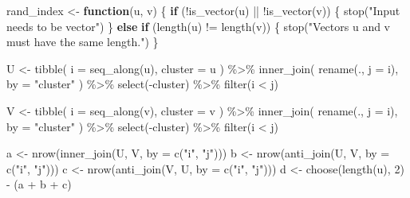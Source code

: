 \documentclass[
]{book}
\newenvironment{Shaded}{\begin{snugshade}}{\end{snugshade}}
\newcommand{\AttributeTok}[1]{\textcolor[rgb]{0.77,0.63,0.00}{#1}}
\newcommand{\ControlFlowTok}[1]{\textcolor[rgb]{0.13,0.29,0.53}{\textbf{#1}}}
\newcommand{\DecValTok}[1]{\textcolor[rgb]{0.00,0.00,0.81}{#1}}
\newcommand{\FunctionTok}[1]{\textcolor[rgb]{0.00,0.00,0.00}{#1}}
\newcommand{\NormalTok}[1]{#1}
\newcommand{\OtherTok}[1]{\textcolor[rgb]{0.56,0.35,0.01}{#1}}
\newcommand{\SpecialCharTok}[1]{\textcolor[rgb]{0.00,0.00,0.00}{#1}}
\newcommand{\StringTok}[1]{\textcolor[rgb]{0.31,0.60,0.02}{#1}}
\begin{document}
\begin{Shaded}
\begin{Highlighting}[]
\NormalTok{rand\_index }\OtherTok{\textless{}{-}} \ControlFlowTok{function}\NormalTok{(u, v) \{}
  \ControlFlowTok{if}\NormalTok{ (}\SpecialCharTok{!}\FunctionTok{is\_vector}\NormalTok{(u) }\SpecialCharTok{||} \SpecialCharTok{!}\FunctionTok{is\_vector}\NormalTok{(v)) \{}
    \FunctionTok{stop}\NormalTok{(}\StringTok{"Input needs to be vector"}\NormalTok{)}
\NormalTok{  \} }\ControlFlowTok{else} \ControlFlowTok{if}\NormalTok{ (}\FunctionTok{length}\NormalTok{(u) }\SpecialCharTok{!=} \FunctionTok{length}\NormalTok{(v)) \{}
    \FunctionTok{stop}\NormalTok{(}\StringTok{"Vectors u and v must have the same length."}\NormalTok{)}
\NormalTok{  \}}
  
\NormalTok{  U }\OtherTok{\textless{}{-}} \FunctionTok{tibble}\NormalTok{(}
    \AttributeTok{i =} \FunctionTok{seq\_along}\NormalTok{(u),}
    \AttributeTok{cluster =}\NormalTok{ u}
\NormalTok{  ) }\SpecialCharTok{\%\textgreater{}\%}
    \FunctionTok{inner\_join}\NormalTok{(}
      \FunctionTok{rename}\NormalTok{(., }\AttributeTok{j =}\NormalTok{ i),}
      \AttributeTok{by =} \StringTok{"cluster"}
\NormalTok{    ) }\SpecialCharTok{\%\textgreater{}\%}
    \FunctionTok{select}\NormalTok{(}\SpecialCharTok{{-}}\NormalTok{cluster) }\SpecialCharTok{\%\textgreater{}\%}
    \FunctionTok{filter}\NormalTok{(i }\SpecialCharTok{\textless{}}\NormalTok{ j) }
  
\NormalTok{  V }\OtherTok{\textless{}{-}} \FunctionTok{tibble}\NormalTok{(}
    \AttributeTok{i =} \FunctionTok{seq\_along}\NormalTok{(v),}
    \AttributeTok{cluster =}\NormalTok{ v}
\NormalTok{  ) }\SpecialCharTok{\%\textgreater{}\%}
    \FunctionTok{inner\_join}\NormalTok{(}
      \FunctionTok{rename}\NormalTok{(., }\AttributeTok{j =}\NormalTok{ i),}
      \AttributeTok{by =} \StringTok{"cluster"}
\NormalTok{    ) }\SpecialCharTok{\%\textgreater{}\%}
    \FunctionTok{select}\NormalTok{(}\SpecialCharTok{{-}}\NormalTok{cluster) }\SpecialCharTok{\%\textgreater{}\%}
    \FunctionTok{filter}\NormalTok{(i }\SpecialCharTok{\textless{}}\NormalTok{ j) }
  
\NormalTok{  a }\OtherTok{\textless{}{-}} \FunctionTok{nrow}\NormalTok{(}\FunctionTok{inner\_join}\NormalTok{(U, V, }\AttributeTok{by =} \FunctionTok{c}\NormalTok{(}\StringTok{"i"}\NormalTok{, }\StringTok{"j"}\NormalTok{)))}
\NormalTok{  b }\OtherTok{\textless{}{-}} \FunctionTok{nrow}\NormalTok{(}\FunctionTok{anti\_join}\NormalTok{(U, V, }\AttributeTok{by =} \FunctionTok{c}\NormalTok{(}\StringTok{"i"}\NormalTok{, }\StringTok{"j"}\NormalTok{)))}
\NormalTok{  c }\OtherTok{\textless{}{-}} \FunctionTok{nrow}\NormalTok{(}\FunctionTok{anti\_join}\NormalTok{(V, U, }\AttributeTok{by =} \FunctionTok{c}\NormalTok{(}\StringTok{"i"}\NormalTok{, }\StringTok{"j"}\NormalTok{)))}
\NormalTok{  d }\OtherTok{\textless{}{-}} \FunctionTok{choose}\NormalTok{(}\FunctionTok{length}\NormalTok{(u), }\DecValTok{2}\NormalTok{) }\SpecialCharTok{{-}}\NormalTok{ (a }\SpecialCharTok{+}\NormalTok{ b }\SpecialCharTok{+}\NormalTok{ c)}
  

\end{Highlighting}
\end{Shaded}
\end{document}
